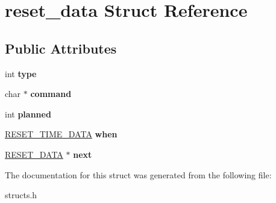 \hypertarget{structreset__data}{\section{reset\-\_\-data Struct Reference}
\label{structreset__data}
}
\subsection*{Public Attributes}
\begin{DoxyCompactItemize}
\item 
\hypertarget{structreset__data_af518385675ad348fe04d9408d896ab4b}{int {\bfseries type}}\label{structreset__data_af518385675ad348fe04d9408d896ab4b}

\item 
\hypertarget{structreset__data_a154e87496be589f7368bd44df6ff35b8}{char $\ast$ {\bfseries command}}\label{structreset__data_a154e87496be589f7368bd44df6ff35b8}

\item 
\hypertarget{structreset__data_a048db6f0dd944e163a034a683cefc9eb}{int {\bfseries planned}}\label{structreset__data_a048db6f0dd944e163a034a683cefc9eb}

\item 
\hypertarget{structreset__data_a0eb10a34752f22bfe0d2dab4686771ba}{\hyperlink{structreset__time__data}{R\-E\-S\-E\-T\-\_\-\-T\-I\-M\-E\-\_\-\-D\-A\-T\-A} {\bfseries when}}\label{structreset__data_a0eb10a34752f22bfe0d2dab4686771ba}

\item 
\hypertarget{structreset__data_a970a80e250723327432365f14d118603}{\hyperlink{structreset__data}{R\-E\-S\-E\-T\-\_\-\-D\-A\-T\-A} $\ast$ {\bfseries next}}\label{structreset__data_a970a80e250723327432365f14d118603}

\end{DoxyCompactItemize}


The documentation for this struct was generated from the following file\-:\begin{DoxyCompactItemize}
\item 
structs.\-h\end{DoxyCompactItemize}

